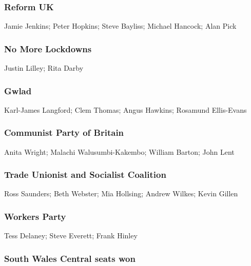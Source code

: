 \begin{resultsiii}
	\subsubsection*{Reform UK}
	Jamie Jenkins; Peter Hopkins; Steve Bayliss; Michael Hancock; Alan Pick
	
	\subsubsection*{No More Lockdowns}
	Justin Lilley; Rita Darby
	
	\subsubsection*{Gwlad}
	Karl-James Langford; Clem Thomas; Angus Hawkins; Rosamund Ellis-Evans
	
	\subsubsection*{Communist Party of Britain}
	Anita Wright; Malachi Walusumbi-Kakembo; William Barton; John Lent
	
	\subsubsection*{Trade Unionist and Socialist Coalition}
	Ross Saunders; Beth Webster; Mia Hollsing; Andrew Wilkes; Kevin Gillen
	
	\subsubsection*{Workers Party}
	Tess Delaney; Steve Everett; Frank Hinley
\end{resultsiii}

\subsubsection*{South Wales Central seats won}


